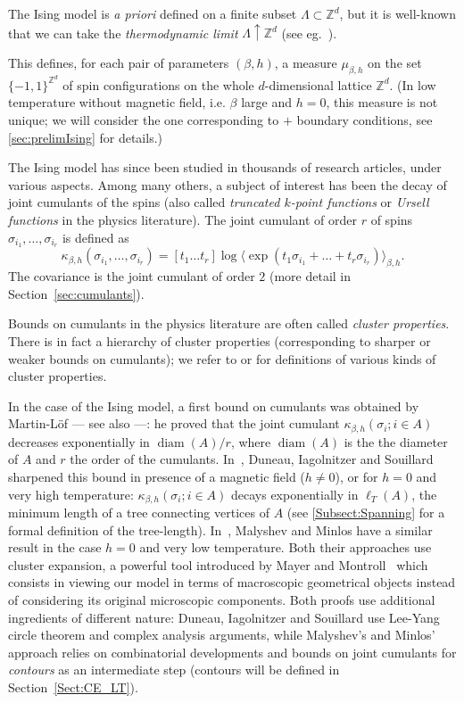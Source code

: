 \documentclass{amsart}
\newcommand{\field}[1]{\mathbb{#1}}
\newcommand{\Z}{\field{Z}}
\DeclareMathOperator\diam{diam}
\numberwithin{equation}{section}
\theoremstyle{remark}
\begin{document}
The Ising model is {\em a priori} defined on a finite subset $\Lambda \subset \Z^d$,
but it is well-known that we can take the {\em thermodynamic limit} $\Lambda \uparrow \Z^d$ (see eg.~\cite{Velenik}).


This defines, for each pair of parameters $(\beta,h)$, a measure $\mu_{\beta,h}$
on the set $\{-1,1\}^{\Z^d}$ of spin configurations on the whole $d$-dimensional lattice $\Z^d$.
(In low temperature without magnetic field, i.e. $\beta$ large and $h=0$,
this measure is not unique; we will consider the one corresponding to $+$ boundary conditions,
see \cref{sec:prelimIsing} for details.)



The Ising model has since been studied in thousands of research articles, under various aspects.
Among many others, a subject of interest has been the decay of joint cumulants of the spins
(also called \emph{truncated $k$-point functions} or \emph{Ursell functions} in the physics literature).
The joint cumulant of order $r$ of spins $\sigma_{i_1},\dots,\sigma_{i_r}$ 
is defined as
$$ \kappa_{\beta,h}(\sigma_{i_1},\dots,\sigma_{i_r}) = [t_1 \dots t_r] \log 
\big\langle \exp(t_1 \sigma_{i_1} + \dots + t_r \sigma_{i_r}) \big\rangle_{\beta,h}.
$$
The covariance is the joint cumulant of order $2$ (more detail in Section~\ref{sec:cumulants}).

Bounds on cumulants in the physics literature are often called {\em cluster properties}.
There is in fact a hierarchy of cluster properties (corresponding to sharper or weaker
bounds on cumulants); we refer to \cite{Duneau1} or \cite[Chapter 6, §1]{Malyshev}
for definitions of various kinds of cluster properties.

In the case of the Ising model, a first bound on cumulants was obtained by Martin-Löf \cite[Eq. (20)]{Lof} --- see also \cite[Section 1]{Lebowitz} ---:
he proved that the joint cumulant $\kappa_{\beta,h}(\sigma_i;i \in A)$ decreases exponentially in $\diam(A)/r$, where $\diam(A)$ is the the diameter of $A$
and $r$ the order of the cumulants.
In~\cite{Duneau}, Duneau, Iagolnitzer and Souillard sharpened this bound in presence of a magnetic field ($h \ne 0$),
or for $h=0$ and very high temperature: $\kappa_{\beta,h}(\sigma_i;i \in A)$ decays exponentially in $\ell_T(A)$,
the minimum length of a tree connecting vertices of $A$ (see \cref{Subsect:Spanning} for a formal definition of the tree-length). 
In~\cite{Malyshev}, Malyshev and Minlos have a similar result in the case $h=0$ and very low temperature.
Both their approaches use cluster expansion, a powerful tool 
introduced by Mayer and Montroll~\cite{Mayer} which consists in viewing
our model in terms of macroscopic geometrical objects instead of considering its original microscopic components.
Both proofs use additional ingredients of different nature:
Duneau, Iagolnitzer and Souillard use Lee-Yang circle theorem and complex analysis arguments,
while Malyshev's and Minlos' approach relies on combinatorial developments and bounds on joint cumulants for \emph{contours}
as an intermediate step (contours will be defined in Section~\ref{Sect:CE_LT}).
\end{document}
